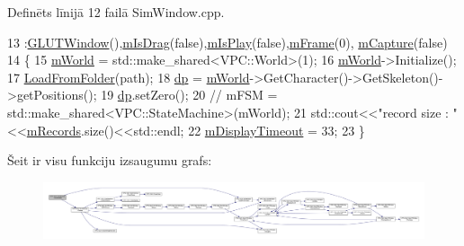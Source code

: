 Definēts līnijā 12 failā Sim\+Window.\+cpp.


\begin{DoxyCode}
13     :\hyperlink{class_v_p_c_1_1_g_u_i_1_1_g_l_u_t_window_a34872e6244c4762090285b502c594336}{GLUTWindow}(),\hyperlink{class_v_p_c_1_1_g_u_i_1_1_sim_window_a1cc866f5524184bbd8e1a2e061b3fe7c}{mIsDrag}(\textcolor{keyword}{false}),\hyperlink{class_v_p_c_1_1_g_u_i_1_1_sim_window_a8c6442f9906e2c458de626825dd477d7}{mIsPlay}(\textcolor{keyword}{false}),\hyperlink{class_v_p_c_1_1_g_u_i_1_1_sim_window_a639a2dd01463388074a24d18d6144832}{mFrame}(0),
      \hyperlink{class_v_p_c_1_1_g_u_i_1_1_sim_window_aba16bb9ad6a9ad532b1c5e5e0951953d}{mCapture}(\textcolor{keyword}{false})
14 \{
15     \hyperlink{class_v_p_c_1_1_g_u_i_1_1_sim_window_a8a2dc03c2b159164e3a1d27e6de8774d}{mWorld} = std::make\_shared<VPC::World>(1);
16     \hyperlink{class_v_p_c_1_1_g_u_i_1_1_sim_window_a8a2dc03c2b159164e3a1d27e6de8774d}{mWorld}->Initialize();
17     \hyperlink{class_v_p_c_1_1_g_u_i_1_1_sim_window_a4d8e529910bdb8c0afa2c675786c10e5}{LoadFromFolder}(path);
18     \hyperlink{class_v_p_c_1_1_g_u_i_1_1_sim_window_a144f2ee38a2a5e72b3b7d9d2505bd23e}{dp} = \hyperlink{class_v_p_c_1_1_g_u_i_1_1_sim_window_a8a2dc03c2b159164e3a1d27e6de8774d}{mWorld}->GetCharacter()->GetSkeleton()->getPositions();
19     \hyperlink{class_v_p_c_1_1_g_u_i_1_1_sim_window_a144f2ee38a2a5e72b3b7d9d2505bd23e}{dp}.setZero();
20 \textcolor{comment}{//  mFSM = std::make\_shared<VPC::StateMachine>(mWorld);}
21     std::cout<<\textcolor{stringliteral}{"record size : "}<<\hyperlink{class_v_p_c_1_1_g_u_i_1_1_sim_window_ac03e0d1150d2500065462383074d38df}{mRecords}.size()<<std::endl;
22     \hyperlink{class_v_p_c_1_1_g_u_i_1_1_g_l_u_t_window_a1a0397ed6b305040c02660e4154d3282}{mDisplayTimeout} = 33;
23 \}
\end{DoxyCode}


Šeit ir visu funkciju izsaugumu grafs\+:
\nopagebreak
\begin{figure}[H]
\begin{center}
\leavevmode
\includegraphics[width=350pt]{class_v_p_c_1_1_g_u_i_1_1_sim_window_a992208c3ff374bcf269d7b7fcbf7324d_cgraph}
\end{center}
\end{figure}




